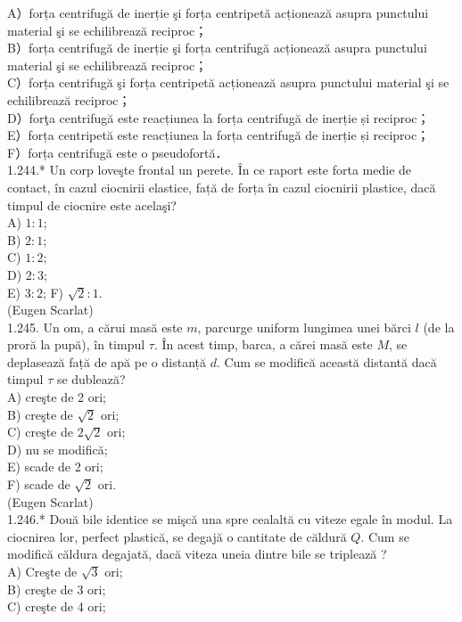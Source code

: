 \documentclass[10pt]{article}
\begin{document}
A）forța centrifugă de inerție şi forța centripetă acționează asupra punctului material şi se echilibrează reciproc；\\
B）forța centrifugă de inerție şi forța centrifugă acționează asupra punctului material şi se echilibrează reciproc；\\
C）forța centrifugă şi forța centripetă acționează asupra punctului material şi se echilibrează reciproc；\\
D）forţa centrifugă este reacțiunea la forța centrifugă de inerție și reciproc；\\
E）forța centripetă este reacțiunea la forța centrifugă de inerție și reciproc；\\
F）forța centrifugă este o pseudofortă．\\
1.244.* Un corp loveşte frontal un perete. În ce raport este forta medie de contact, în cazul ciocnirii elastice, față de forța în cazul ciocnirii plastice, dacă timpul de ciocnire este acelaşi?\\
A) $1: 1$;\\
B) $2: 1$;\\
C) $1: 2$;\\
D) $2: 3$;\\
E) $3: 2$; F) $\sqrt{2}: 1$.\\
(Eugen Scarlat)\\
1.245. Un om, a cărui masă este $m$, parcurge uniform lungimea unei bărci $l$ (de la proră la pupă), în timpul $\tau$. În acest timp, barca, a cărei masă este $M$, se deplasează faṭă de apă pe o distanță $d$. Cum se modifică această distantă dacă timpul $\tau$ se dublează?\\
A) creşte de 2 ori;\\
B) creşte de $\sqrt{2}$ ori;\\
C) creşte de $2 \sqrt{2}$ ori;\\
D) nu se modifică;\\
E) scade de 2 ori;\\
F) scade de $\sqrt{2}$ ori.\\
(Eugen Scarlat)\\
1.246.* Două bile identice se mişcă una spre cealaltă cu viteze egale în modul. La ciocnirea lor, perfect plastică, se degajă o cantitate de căldură $Q$. Cum se modifică căldura degajată, dacă viteza uneia dintre bile se triplează ?\\
A) Creşte de $\sqrt{3}$ ori;\\
B) creşte de 3 ori;\\
C) creşte de 4 ori;\\
\end{document}
